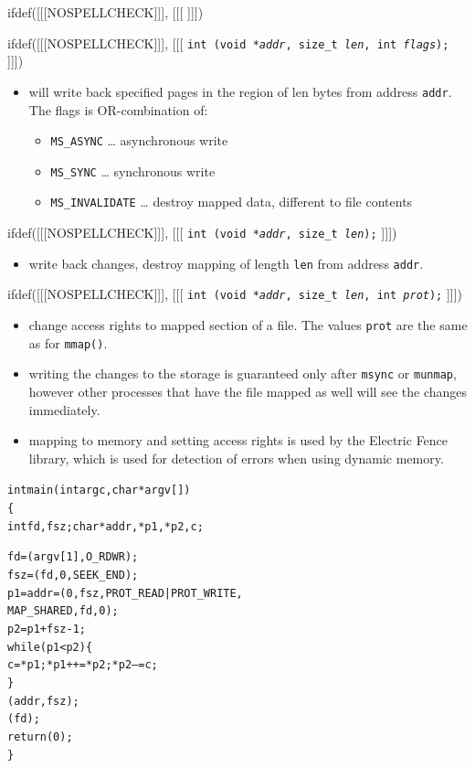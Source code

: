 
ifdef([[[NOSPELLCHECK]]], [[[
]]])

\begin{slide}
ifdef([[[NOSPELLCHECK]]], [[[
\texttt{int (void *\emph{addr}, size\_t \emph{l{}en},
int \emph{flags});}
]]])
\begin{itemize}
\item will write back specified pages in the region of l{}en bytes from address
\texttt{addr}. The flags is OR-combination of:
    \begin{itemize}
    \item \texttt{MS\_ASYNC} \dots{} asynchronous write
    \item \texttt{MS\_SYNC} \dots{} synchronous write
    \item \texttt{MS\_INVALIDATE} \dots{} destroy mapped data,
    different to file contents
    \end{itemize}
\end{itemize}
ifdef([[[NOSPELLCHECK]]], [[[
\texttt{int (void *\emph{addr}, size\_t \emph{l{}en});}
]]])
\begin{itemize}
\item write back changes, destroy mapping of length \texttt{l{}en} from
address \texttt{addr}.
\end{itemize}
ifdef([[[NOSPELLCHECK]]], [[[
\texttt{int (void *\emph{addr}, size\_t \emph{l{}en},
int \emph{prot});}
]]])
\begin{itemize}
\item change access rights to mapped section of a file. The values
\texttt{prot} are the same as for \texttt{mmap()}.
\end{itemize}
\end{slide}

\begin{itemize}
\item writing the changes to the storage is guaranteed only after
\texttt{msync} or \texttt{munmap}, however other processes that have the file
mapped as well will see the changes immediately.
\item mapping to memory and setting access rights is used by the
Electric Fence library, which is used for detection of errors when using
dynamic memory.
\end{itemize}



\begin{slide}
\setlength{\baselineskip}{0.8\baselineskip}
\begin{alltt}
int main(int argc, char *argv[])
\{
    int fd, fsz; char *addr, *p1, *p2, c;

    fd = (argv[1], O\_RDWR);
    fsz = (fd, 0, SEEK\_END);
    p1 = addr = (0, fsz, PROT\_READ|PROT\_WRITE,
                     MAP\_SHARED, fd, 0);
    p2 = p1 + fsz - 1;
    while(p1<p2) \{
        c = *p1; *p1++ = *p2; *p2-- = c;
    \}
    (addr, fsz); 
    (fd);
    return (0);
\}
\end{alltt}
\end{slide}

